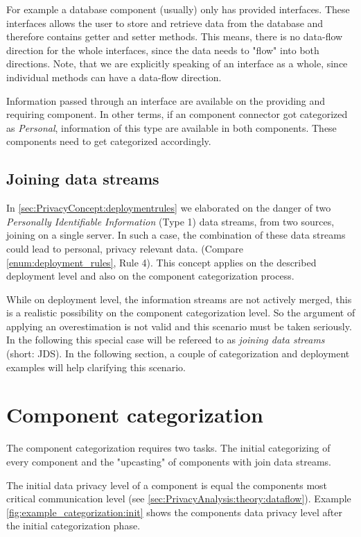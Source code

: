 For example a database component (usually) only has provided interfaces. These interfaces allows the user to store and retrieve data from the database and therefore contains getter and setter methods. This means, there is no data-flow direction for the whole interfaces, since the data needs to "flow" into both directions. Note, that we are explicitly speaking of an interface as a whole, since individual methods can have a data-flow direction.

Information passed through an interface are available on the providing and requiring component. In other terms, if an component connector got categorized as \textit{Personal}, information of this type are available in both components. These components need to get categorized accordingly.

\subsection{Joining data streams}
\label{sec:PrivacyAnalysis:theory:jds}
In \autoref{sec:PrivacyConcept:deploymentrules} we elaborated on the danger of two \textit{Personally Identifiable Information} (Type 1) data streams, from two sources, joining on a single server. In such a case, the combination of these data streams could lead to personal, privacy relevant data. (Compare \autoref{enum:deployment_rules}, Rule 4). This concept applies on the described deployment level and also on the component categorization process.

While on deployment level, the information streams are not actively merged, this is a realistic possibility on the component categorization level. So the argument of applying an overestimation is not valid and this scenario must be taken seriously. In the following this special case will be refereed to as \textit{joining data streams} (short: JDS). In the following section, a couple of categorization and deployment examples will help clarifying this scenario.


\section{Component categorization}
\label{sec:PrivacyAnalysis:categorization}

The component categorization requires two tasks. The initial categorizing of every component and the "upcasting" of components with join data streams.

The initial data privacy level of a component is equal the components most critical communication level (see \autoref{sec:PrivacyAnalysis:theory:dataflow}). Example \autoref{fig:example_categorization:init} shows the components data privacy level after the initial categorization phase.

